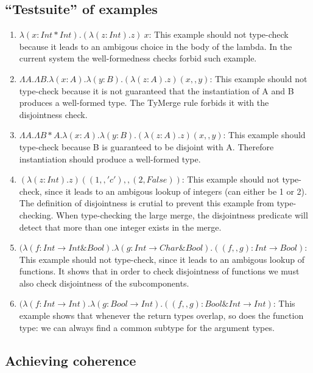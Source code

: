 \documentclass[nocopyrightspace,preprint,times,9pt]{sigplanconf}
\begin{document}
\subsection{``Testsuite'' of examples}

\begin{enumerate}

\item $\lambda (x : Int * Int). (\lambda (z : Int) . z)~x$: This
  example should not type-check because it leads to an ambigous choice
  in the body of the lambda. In the current system the well-formedness
  checks forbid such example.

\item $\Lambda A.\Lambda B.\lambda (x:A).\lambda (y:B). (\lambda (z:A)
  . z) (x,,y)$: This example should not type-check because it is not
  guaranteed that the instantiation of A and B produces a well-formed
  type. The TyMerge rule forbids it with the disjointness check.

\item $\Lambda A.\Lambda B * A.\lambda (x:A).\lambda (y:B). (\lambda
  (z:A) . z) (x,,y)$: This example should type-check because B is
  guaranteed to be disjoint with A. Therefore instantiation should
  produce a well-formed type.

\item $(\lambda (z:Int) . z) ((1,,'c'),,(2,False))$: This example
  should not type-check, since it leads to an ambigous lookup of
  integers (can either be 1 or 2). The definition of disjointness is
  crutial to prevent this example from type-checking. When
  type-checking the large merge, the disjointness predicate will
  detect that more than one integer exists in the merge.

\item $(\lambda (f: Int \to Int \& Bool) . \lambda (g : Int \to Char \& Bool) . ((f,,g) : Int \to Bool)$:
  This example
  should not type-check, since it leads to an ambigous lookup of
  functions. It shows that in order to check disjointness
  of functions we must also check disjointness of the subcomponents.

\item $(\lambda (f: Int \to Int) . \lambda (g : Bool \to Int) . ((f,,g) : Bool \& Int \to Int)$:
  This example shows that whenever the return types overlap, so does the function type:
  we can always find a common subtype for the argument types.
\end{enumerate}

\subsection{Achieving coherence}
\end{document}
